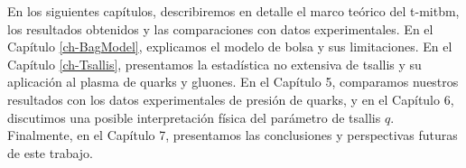 En los siguientes capítulos, describiremos en detalle el marco teórico del \gls{t-mitbm}, los resultados obtenidos y las comparaciones con datos experimentales. En el Capítulo \ref{ch-BagModel}, explicamos el modelo de bolsa y sus limitaciones. En el Capítulo \ref{ch-Tsallis}, presentamos la estadística no extensiva de \Gls{tsallis} y su aplicación al plasma de quarks y gluones. En el Capítulo 5, comparamos nuestros resultados con los datos experimentales de presión de quarks, y en el Capítulo 6, discutimos una posible interpretación física del parámetro de \Gls{tsallis} $q$. Finalmente, en el Capítulo 7, presentamos las conclusiones y perspectivas futuras de este trabajo.

\newpage

\thispagestyle{empty}